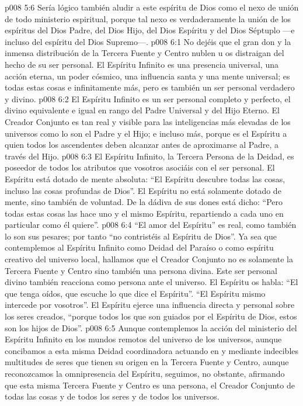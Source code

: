 \vs p008 5:6 Sería lógico también aludir a este espíritu de Dios como el nexo de unión de todo ministerio espiritual, porque tal nexo es verdaderamente la unión de los espíritus del Dios Padre, del Dios Hijo, del Dios Espíritu y del Dios Séptuplo ---e incluso del espíritu del Dios Supremo---.
\vs p008 6:1 No dejéis que el gran don y la inmensa distribución de la Tercera Fuente y Centro nublen u os distraigan del hecho de su ser personal. El Espíritu Infinito es una presencia universal, una acción eterna, un poder cósmico, una influencia santa y una mente universal; es todas estas cosas e infinitamente más, pero es también un ser personal verdadero y divino.
\vs p008 6:2 El Espíritu Infinito es un ser personal completo y perfecto, el divino equivalente e igual en rango del Padre Universal y del Hijo Eterno. El Creador Conjunto es tan real y visible para las inteligencias más elevadas de los universos como lo son el Padre y el Hijo; e incluso más, porque es el Espíritu a quien todos los ascendentes deben alcanzar antes de aproximarse al Padre, a través del Hijo.
\vs p008 6:3 El Espíritu Infinito, la Tercera Persona de la Deidad, es poseedor de todos los atributos que vosotros asociáis con el ser personal. El Espíritu está dotado de mente absoluta: “El Espíritu descubre todas las cosas, incluso las cosas profundas de Dios”. El Espíritu no está solamente dotado de mente, sino también de voluntad. De la dádiva de sus dones está dicho: “Pero todas estas cosas las hace uno y el mismo Espíritu, repartiendo a cada uno en particular como él quiere”.
\vs p008 6:4 “El amor del Espíritu” es real, como también lo son sus pesares; por tanto “no contristéis al Espíritu de Dios”. Ya sea que contemplemos al Espíritu Infinito como Deidad del Paraíso o como espíritu creativo del universo local, hallamos que el Creador Conjunto no es solamente la Tercera Fuente y Centro sino también una persona divina. Este ser personal divino también reacciona como persona ante el universo. El Espíritu os habla: “El que tenga oídos, que escuche lo que dice el Espíritu”. “El Espíritu mismo intercede por vosotros”. El Espíritu ejerce una influencia directa y personal sobre los seres creados, “porque todos los que son guiados por el Espíritu de Dios, estos son los hijos de Dios”.
\vs p008 6:5 Aunque contemplemos la acción del ministerio del Espíritu Infinito en los mundos remotos del universo de los universos, aunque concibamos a esta misma Deidad coordinadora actuando en y mediante indecibles multitudes de seres que tienen su origen en la Tercera Fuente y Centro, aunque reconozcamos la omnipresencia del Espíritu, seguimos, no obstante, afirmando que esta misma Tercera Fuente y Centro es una persona, el Creador Conjunto de todas las cosas y de todos los seres y de todos los universos.
